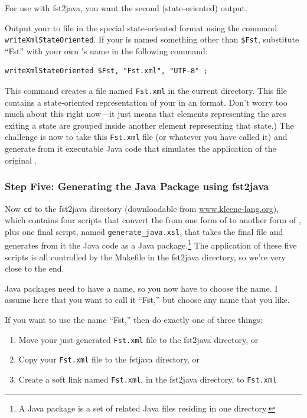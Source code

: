 \noindent
For use with fst2java, you want the second (state-oriented) output.

Output your \fsm{} to file in the special state-oriented \xml{} format
using the command \texttt{writeXmlStateOriented}.  If your \fsm{} is named
something other than \verb!$Fst!, substitute ``Fst'' with your own \fsm{}'s name in
the following command:

\begin{Verbatim}
writeXmlStateOriented $Fst, "Fst.xml", "UTF-8" ;
\end{Verbatim}

\noindent
This command creates a file named \texttt{Fst.xml} in the current directory.
This file contains a state-oriented representation of your \fsm{} in an
\xml{} format.  Don't worry too much about this right now---it just means that \xml{} elements
representing the arcs exiting a state are grouped inside another \xml{} element
representing that state.) The challenge is now to take this \texttt{Fst.xml}
file (or whatever you have called it) and generate from it executable
Java code that simulates the application of the original \fsm{}.

\subsubsection{Step Five:  Generating the Java Package using fst2java}

Now \texttt{cd} to the fst2java directory (downloadable from
\url{www.kleene-lang.org}), which contains four \xslt{} scripts that
convert the \fsm{} from one form of \xml{} to another form of \xml{}, plus one
final \xslt{} script, named \texttt{generate\_java.xsl}, that takes the final \xml{}
file and generates from it the Java code as a Java package.\footnote{A Java package is a set of related Java files residing in
one directory.}  The
application of these five \xslt{} scripts is all controlled by the Makefile
in the fst2java directory, so we're very close to the end.

Java packages need to have a name, so you now have to
choose the name.  I assume
here that you want to call it ``Fst,'' but choose any name that you like.

If you want to use the name ``Fst,'' then do exactly one of three things:

\begin{enumerate}
\item
Move your just-generated \texttt{Fst.xml} file to the fst2java directory, or
\item
Copy your \texttt{Fst.xml} file to the fstjava directory, or
\item
Create a soft link named \texttt{Fst.xml}, in the fst2java directory, to \texttt{Fst.xml}
\end{enumerate}


